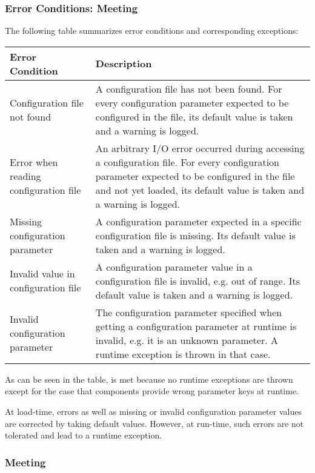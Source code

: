 \subsubsection{Error Conditions: Meeting \REQUconfigErrors{}}
\label{sec:ErrorConditionsREQUconfigErrors}

The following table summarizes error conditions and corresponding exceptions:

\begin{longtable}{|p{}|p{}|}
	\hline
	Error Condition & Description \\
	\endhead
	\hline
	Configuration file not found & A configuration file has not been found. For every configuration parameter expected to be configured in the file, its default value is taken and a warning is logged.\\
	\hline
	Error when reading configuration file & An arbitrary I/O error occurred during accessing a configuration file. For every configuration parameter expected to be configured in the file and not yet loaded, its default value is taken and a warning is logged.\\
	\hline
	Missing configuration parameter & A configuration parameter expected in a specific configuration file is missing. Its default value is taken and a warning is logged.\\
	\hline
	Invalid value in configuration file & A configuration parameter value in a configuration file is invalid, e.g. out of range. Its default value is taken and a warning is logged.\\
	\hline
	Invalid configuration parameter & The configuration parameter specified when getting a configuration parameter at runtime is invalid, e.g. it is an unknown parameter. A runtime exception is thrown in that case.\\
\end{longtable}

As can be seen in the table, \REQUconfigErrors{} is met because no runtime exceptions are thrown except for the case that components provide wrong parameter keys at runtime.

At load-time, errors as well as missing or invalid configuration parameter values are corrected by taking default values. However, at run-time, such errors are not tolerated and lead to a runtime exception.


\subsubsection{Meeting \REQUconfigTestCaseChanges{}}
\label{sec:REQUconfigTestCaseChanges}

